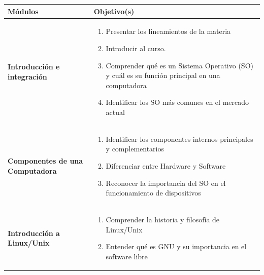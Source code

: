 \documentclass[
  spanish,
  12pt,
  letterpaper,
  DIV=11,
  numbers=noendperiod]{scrreprt}
\newcounter{none} %
\providecommand{\tightlist}{%
  \setlength{\itemsep}{0pt}\setlength{\parskip}{0pt}}
\begin{document}
{\def\LTcaptype{none} %
\begin{longtable}[]{@{}
  >{\raggedright\arraybackslash}p{}
  >{\raggedright\arraybackslash}p{}@{}}
\toprule\noalign{}
\begin{minipage}[b]{\linewidth}\raggedright
Módulos
\end{minipage} & \begin{minipage}[b]{\linewidth}\raggedright
Objetivo(s)
\end{minipage} \\
\midrule\noalign{}
\endhead
\bottomrule\noalign{}
\endlastfoot
\textbf{Introducción e integración} &
\begin{minipage}[t]{\linewidth}\raggedright
\begin{enumerate}
\def\labelenumi{\arabic{enumi}.}
\tightlist
\item
  Presentar los lineamientos de la materia
\item
  Introducir al curso.
\item
  Comprender qué es un Sistema Operativo (SO) y cuál es su función
  principal en una computadora
\item
  Identificar los SO más comunes en el mercado actual
\end{enumerate}
\end{minipage} \\
\textbf{Componentes de una Computadora} &
\begin{minipage}[t]{\linewidth}\raggedright
\begin{enumerate}
\def\labelenumi{\arabic{enumi}.}
\tightlist
\item
  Identificar los componentes internos principales y complementarios
\item
  Diferenciar entre Hardware y Software
\item
  Reconocer la importancia del SO en el funcionamiento de dispositivos
\end{enumerate}
\end{minipage} \\
\textbf{Introducción a Linux/Unix} &
\begin{minipage}[t]{\linewidth}\raggedright
\begin{enumerate}
\def\labelenumi{\arabic{enumi}.}
\tightlist
\item
  Comprender la historia y filosofía de Linux/Unix
\item
  Entender qué es GNU y su importancia en el software libre

\end{enumerate}
\end{minipage}
\end{longtable}}
\end{document}
